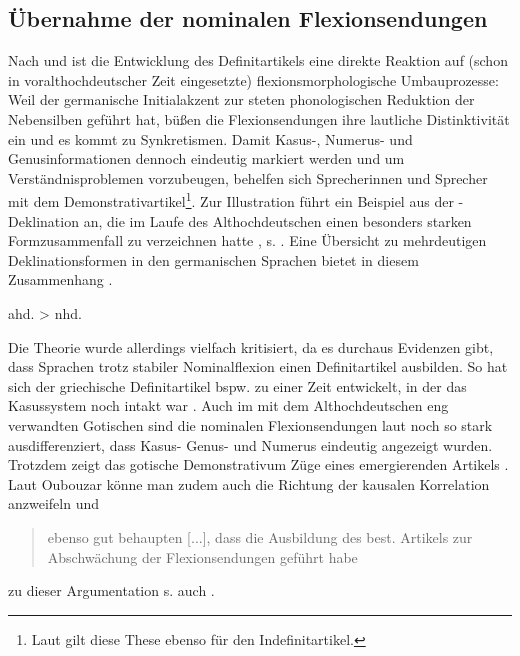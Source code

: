 \subsection{Übernahme der nominalen Flexionsendungen} \label{sec:flexion} 

Nach \textcite[168-170]{Tschirch1983} und \textcite[13]{vonPolenz2009} ist die Entwicklung des Definitartikels eine direkte Reaktion auf (schon in voralthochdeutscher Zeit eingesetzte) flexionsmorphologische Umbauprozesse: Weil der germanische Initialakzent zur steten phonologischen Reduktion der Nebensilben geführt hat, büßen die Flexionsendungen ihre lautliche Distinktivität ein und es kommt zu Synkretismen. Damit Kasus-, Numerus- und Genusinformationen dennoch eindeutig markiert werden und um Verständnisproblemen vorzubeugen, behelfen sich Sprecherinnen und Sprecher mit dem Demonstrativartikel\footnote{Laut \textcite[70]{Schildt1981} gilt diese These ebenso für den Indefinitartikel.}. Zur Illustration führt \textcite[13]{vonPolenz2009} ein Beispiel aus der -Deklination an, die im Laufe des Althochdeutschen einen besonders starken Formzusammenfall zu verzeichnen hatte \parencite[248]{Meineke2001}, s. . Eine Übersicht zu mehrdeutigen Deklinationsformen in den germanischen Sprachen bietet in diesem Zusammenhang \textcite[48-51]{Heinrichs1954}. 
 
\begin{exe}
	\ex \label{ex:flexion}   
	ahd.  > nhd. 
\end{exe}

Die Theorie wurde allerdings vielfach kritisiert, da es durchaus Evidenzen gibt, dass Sprachen trotz stabiler Nominalflexion einen Definitartikel ausbilden. So hat sich der griechische Definitartikel bspw. zu einer Zeit entwickelt, in der das Kasussystem noch intakt war \parencite[44]{Ebert1978}. 
Auch im mit dem Althochdeutschen eng verwandten Gotischen sind die nominalen Flexionsendungen laut \textcite[10]{Kovari1984} noch so stark ausdifferenziert, dass Kasus- Genus- und Numerus eindeutig angezeigt wurden. Trotzdem zeigt das gotische Demonstrativum Züge eines emergierenden Artikels \parencite[vgl.][114-155]{Leiss2000}. Laut Oubouzar könne man zudem auch die Richtung der kausalen Korrelation anzweifeln und \blockcquote[71]{Oubouzar1992}{ebenso gut behaupten
[...], dass die Ausbildung des best. Artikels zur Abschwächung der Flexionsendungen geführt habe}; zu dieser Argumentation s. auch \textcite[51]{Heinrichs1954}.  

